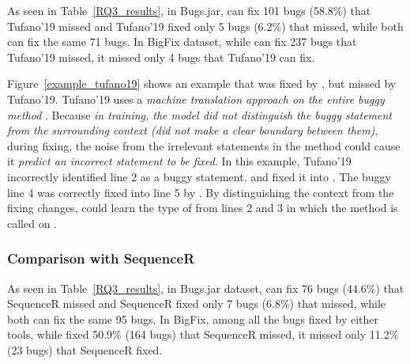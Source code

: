 As seen in Table~\ref{RQ3_results}, in Bugs.jar, {\tool} can fix 101
bugs (58.8\%) that Tufano'19 missed and Tufano'19 fixed only 5 bugs
(6.2\%) that {\tool} missed, while both can fix the same 71 bugs.
In BigFix dataset, while {\tool} can fix 237 bugs that Tufano'19
missed, it missed only 4 bugs that Tufano'19 can fix.

Figure~\ref{example_tufano19} shows an example that was fixed by
{\tool}, but missed by Tufano'19. Tufano'19 uses a {\em
  machine translation approach on the entire buggy method}
.  Because {\em in training, the model did not
distinguish the buggy statement from the surrounding context (did not
make a clear boundary between them)}, during fixing, the noise from the
irrelevant statements in the method could cause it {\em predict an
  incorrect statement to be fixed}. In this example, Tufano'19
incorrectly identified line 2 as a buggy statement, and fixed it into
  \code{()} \code{==} 
 . The buggy line 4 was correctly fixed into
line 5 by {\tool}. By distinguishing the context from the fixing
changes, {\tool} could learn the type  of 
from lines 2 and 3 in which the method  is called on
.




\subsubsection{\bf Comparison with SequenceR}

As seen in Table~\ref{RQ3_results}, in Bugs\-.jar dataset, {\tool} can
fix 76 bugs (44.6\%) that SequenceR missed and SequenceR fixed only 7
bugs (6.8\%) that {\tool} missed, while both can fix the same 95 bugs.
In BigFix, among all the bugs fixed by either
tools, while {\tool} fixed 50.9\% (164 bugs) that SequenceR missed,
it missed only 11.2\% (23 bugs) that SequenceR fixed.

